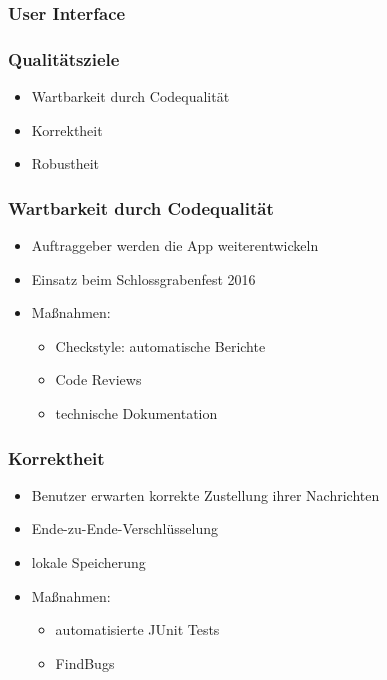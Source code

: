 \documentclass[accentcolor=tud4c,colorbacktitle]{tudbeamer}
\begin{document}
  \begin{frame}
    \frametitle{User Interface}
  \end{frame}

  \begin{frame}
    \frametitle{Qualitätsziele}
    \begin{itemize}
      \item Wartbarkeit durch Codequalität
      \item Korrektheit
      \item Robustheit
    \end{itemize}
  \end{frame}

  \begin{frame}
    \frametitle{Wartbarkeit durch Codequalität}
    \begin{itemize}
      \item Auftraggeber werden die App weiterentwickeln
      \item Einsatz beim Schlossgrabenfest 2016
    \end{itemize}
    \begin{itemize}
      \item Maßnahmen:
        \begin{itemize}
          \item Checkstyle: automatische Berichte
          \item Code Reviews
          \item technische Dokumentation
        \end{itemize}
    \end{itemize}
  \end{frame}

  \begin{frame}
    \frametitle{Korrektheit}
    \begin{itemize}
      \item Benutzer erwarten korrekte Zustellung ihrer Nachrichten
      \item Ende-zu-Ende-Verschlüsselung
      \item lokale Speicherung
    \end{itemize}
    \begin{itemize}
      \item Maßnahmen:
        \begin{itemize}
          \item automatisierte JUnit Tests
          \item FindBugs
        \end{itemize}
    \end{itemize}
  \end{frame}
\end{document}
